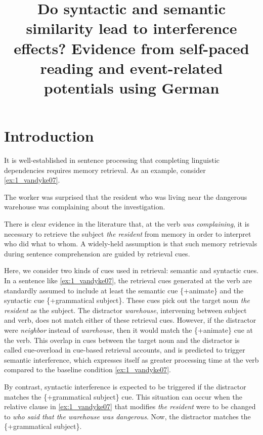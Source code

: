 \documentclass[a4paper, man, floatsintext]{apa7}
\title{\hspace{1cm} Do syntactic and semantic similarity lead to interference effects?\newline
Evidence from self-paced reading and event-related potentials using German}
\affiliation{
Department of Linguistics, University of Potsdam}
\begin{document}
\maketitle

\section{Introduction}

It is well-established in sentence processing that completing linguistic dependencies requires memory retrieval. As an example, consider 
\ref{ex:1_vandyke07}.

\begin{exe}[ht]
\ex \label{ex:1_vandyke07} 
The worker was surprised that the resident who was living near the dangerous warehouse was complaining about the investigation. \parencite{vandyke07}
\end{exe}

There is clear evidence in the literature  \parencite[e.g.,][]{jaeger_etal_2020, nicenboim, vandyke_mcelree06, vandyke_lewis03} that, at the verb \textit{was complaining}, it is necessary to retrieve the subject \textit{the resident} from memory in order to interpret who did what to whom. A widely-held assumption is that such memory retrievals during sentence comprehension are guided by retrieval cues. 

Here, we consider two kinds of cues used in retrieval: semantic and  syntactic cues.
In a sentence like \ref{ex:1_vandyke07}, the retrieval cues generated at the verb are standardly assumed to include at least  the semantic cue \{+animate\} and the syntactic cue \{+grammatical subject\}. These cues pick out the target noun \textit{the resident} as the subject. The distractor \textit{warehouse}, intervening between subject and verb, does not match either of these retrieval cues. However, if the distractor were \textit{neighbor} instead of \textit{warehouse}, then it would match the \{+animate\} cue at the verb. This overlap in cues between the target noun and the distractor is called cue-overload in cue-based retrieval accounts, and is predicted to trigger semantic interference, which expresses itself as greater processing time at the verb compared to the baseline condition \ref{ex:1_vandyke07}.

By contrast, syntactic interference is expected to be triggered if the distractor matches the \{+grammatical subject\} cue. This situation can occur when the relative clause  in \ref{ex:1_vandyke07} that modifies \textit{the resident} were to be changed to \textit{who said that the warehouse was dangerous}. Now, the distractor matches the \{+grammatical subject\}. 
\end{document}
